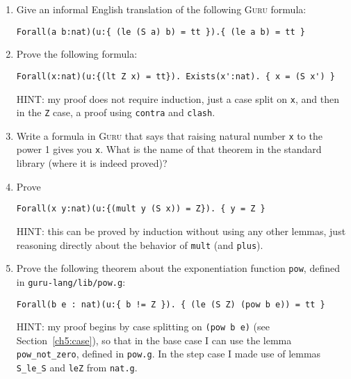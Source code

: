 \documentclass{book}[12pt]
\newcommand{\guru}[0]{\textsc{Guru}\xspace}
\begin{document}
\begin{enumerate}

\item Give an informal English translation of the following \guru formula:

\begin{verbatim}
Forall(a b:nat)(u:{ (le (S a) b) = tt }).{ (le a b) = tt }
\end{verbatim}

\item Prove the following formula:

\begin{verbatim}
Forall(x:nat)(u:{(lt Z x) = tt}). Exists(x':nat). { x = (S x') }
\end{verbatim}

\noindent HINT: my proof does not require induction, just a case split
on \texttt{x}, and then in the \texttt{Z} case, a proof using
\texttt{contra} and \texttt{clash}.

\item Write a formula in \guru that says that raising natural number
\texttt{x} to the power 1 gives you \texttt{x}.  What is the name of
that theorem in the standard library (where it is indeed proved)?

\item Prove

\begin{verbatim}
Forall(x y:nat)(u:{(mult y (S x)) = Z}). { y = Z }
\end{verbatim}

\noindent HINT: this can be proved by induction without using any
other lemmas, just reasoning directly about the behavior of
\texttt{mult} (and \texttt{plus}).

\item Prove the following theorem about the exponentiation function
\texttt{pow}, defined in \texttt{guru-lang/lib/pow.g}:

\begin{verbatim}
Forall(b e : nat)(u:{ b != Z }). { (le (S Z) (pow b e)) = tt }
\end{verbatim}

\noindent HINT: my proof begins by case splitting on \texttt{(pow b
e)} (see Section~\ref{ch5:case}), so that in the base case I can use
the lemma \texttt{pow\_not\_zero}, defined in \texttt{pow.g}.  In the
step case I made use of lemmas \texttt{S\_le\_S} and \texttt{leZ} from
\texttt{nat.g}.

\end{enumerate}
\end{document}
